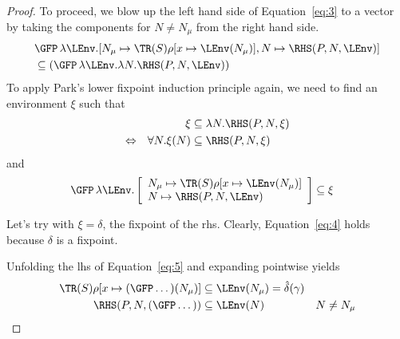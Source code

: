 \begin{proof}
  To proceed, we blow up the left hand side of Equation~\eqref{eq:3} to a vector by taking the
  components for $N \ne N_\mu$ from the right hand side.
  \begin{align*}
    & \GFP\, \lambda \LEnv. [N_\mu \mapsto \TR (S) \rho[x \mapsto \LEnv(N_\mu)], N \mapsto \RHS (P, N, \LEnv)]
      \\
    & \subseteq
      (\GFP\, \lambda \LEnv. \lambda N. \RHS (P, N, \LEnv))
  \end{align*}
  To apply Park's lower fixpoint induction principle again, we need to find an environment $\xi$ such that 
  \begin{align}\label{eq:4}
    && \xi & \subseteq \lambda N. \RHS (P, N, \xi)  \\
    \notag\Leftrightarrow &
           & \forall N. \xi (N) & \subseteq \RHS (P, N, \xi)
  \end{align}
  and
  \begin{align}\label{eq:5}
    \GFP\, \lambda \LEnv.
    \left[
    \begin{array}{l}
      N_\mu \mapsto \TR (S) \rho[x \mapsto \LEnv(N_\mu)] \\
      N \mapsto \RHS (P, N,    \LEnv)
    \end{array}
    \right]
 &\subseteq \xi
  \end{align}
  
  Let's try with $\xi=\delta$, the fixpoint of the rhs.
  Clearly, Equation~\eqref{eq:4} holds because $\delta$ is a fixpoint.

  Unfolding the lhs of Equation~\eqref{eq:5} and expanding pointwise yields
  \begin{align}
    \TR (S) \rho[x \mapsto (\GFP\dots)(N_\mu)] & \subseteq \LEnv (N_\mu)  = \hat\delta (\gamma)\\
    \RHS (P, N,  (\GFP\dots)) & \subseteq \LEnv (N) & N \ne N_\mu
  \end{align}


\end{proof}
